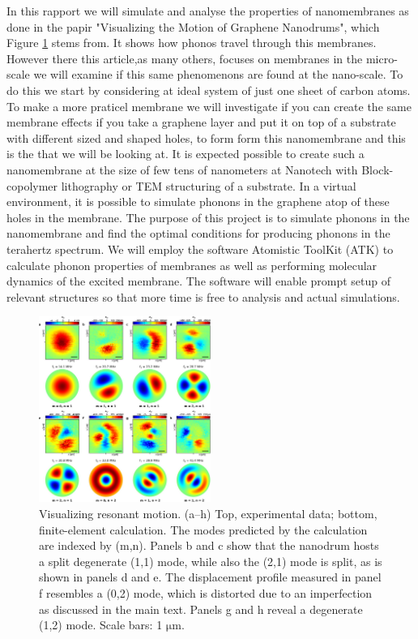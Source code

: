 In this rapport we will simulate and analyse the properties of nanomembranes as done in the papir "Visualizing the Motion of Graphene Nanodrums"\cite{Davidovikj2016}, which Figure \cref{Motivation} stems from. It shows how phonos travel through this membranes. However there this article,as many others, focuses on membranes in the micro-scale we will examine if this same phenomenons are found at the nano-scale. To do this we start by considering at ideal system of just one sheet of carbon atoms.
To make a more praticel membrane we will investigate if you can create the same membrane effects if you take a graphene layer and put it on top of a substrate with different sized and shaped holes, to form
form this nanomembrane and this is the that we will be looking at. It is expected possible to create such a nanomembrane at the
size of few tens of nanometers at Nanotech with Block-copolymer lithography or TEM
structuring of a substrate. In a virtual environment, it is possible to simulate phonons
in the graphene atop of these holes in the membrane. The purpose of this project is to
simulate phonons in the nanomembrane and find the optimal conditions for producing
phonons in the terahertz spectrum.
We will employ the software Atomistic ToolKit (ATK) to calculate phonon properties
of membranes as well as performing molecular dynamics of the excited membrane. The
software will enable prompt setup of relevant structures so that more time is free to analysis
and actual simulations.
\begin{figure}
    \centering
    \includegraphics[width=0.5\textwidth]{Figures/NanoDrums.png}
    \caption{Visualizing resonant motion. (a–h) Top, experimental data; bottom, finite-element calculation. The modes predicted by the calculation are indexed by (m,n). Panels b and c show that the nanodrum hosts a split degenerate (1,1) mode, while also the (2,1) mode is split, as is shown in panels d and e. The displacement profile measured in panel f resembles a (0,2) mode, which is distorted due to an imperfection as discussed in the main text. Panels g and h reveal a degenerate (1,2) mode. Scale bars: 1 $\mathrm{\mu m}$.\cite{Davidovikj2016}}
    \label{Motivation}
\end{figure}